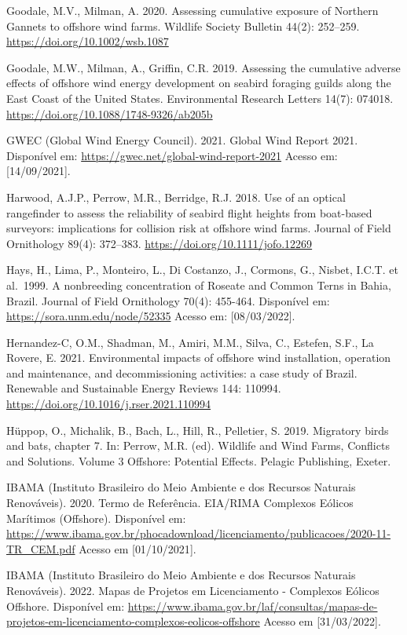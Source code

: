 \documentclass[
  oneside]{scrbook}
\begin{document}
Goodale, M.V., Milman, A. 2020. Assessing cumulative exposure of Northern Gannets to offshore wind farms. Wildlife Society Bulletin 44(2): 252--259. \url{https://doi.org/10.1002/wsb.1087}

Goodale, M.W., Milman, A., Griffin, C.R. 2019. Assessing the cumulative adverse effects of offshore wind energy development on seabird foraging guilds along the East Coast of the United States. Environmental Research Letters 14(7): 074018. \url{https://doi.org/10.1088/1748-9326/ab205b}

GWEC (Global Wind Energy Council). 2021. Global Wind Report 2021. Disponível em: \url{https://gwec.net/global-wind-report-2021} Acesso em: {[}14/09/2021{]}.

Harwood, A.J.P., Perrow, M.R., Berridge, R.J. 2018. Use of an optical rangefinder to assess the reliability of seabird flight heights from boat-based surveyors: implications for collision risk at offshore wind farms. Journal of Field Ornithology 89(4): 372--383. \url{https://doi.org/10.1111/jofo.12269}

Hays, H., Lima, P., Monteiro, L., Di Costanzo, J., Cormons, G., Nisbet, I.C.T. et al.~1999. A nonbreeding concentration of Roseate and Common Terns in Bahia, Brazil. Journal of Field Ornithology 70(4): 455-464. Disponível em: \url{https://sora.unm.edu/node/52335} Acesso em: {[}08/03/2022{]}.

Hernandez-C, O.M., Shadman, M., Amiri, M.M., Silva, C., Estefen, S.F., La Rovere, E. 2021. Environmental impacts of offshore wind installation, operation and maintenance, and decommissioning activities: a case study of Brazil. Renewable and Sustainable Energy Reviews 144: 110994. \url{https://doi.org/10.1016/j.rser.2021.110994}

Hüppop, O., Michalik, B., Bach, L., Hill, R., Pelletier, S. 2019. Migratory birds and bats, chapter 7. In: Perrow, M.R. (ed). Wildlife and Wind Farms, Conflicts and Solutions. Volume 3 Offshore: Potential Effects. Pelagic Publishing, Exeter.

IBAMA (Instituto Brasileiro do Meio Ambiente e dos Recursos Naturais Renováveis). 2020. Termo de Referência. EIA/RIMA Complexos Eólicos Marítimos (Offshore). Disponível em: \url{https://www.ibama.gov.br/phocadownload/licenciamento/publicacoes/2020-11-TR_CEM.pdf} Acesso em {[}01/10/2021{]}.

IBAMA (Instituto Brasileiro do Meio Ambiente e dos Recursos Naturais Renováveis). 2022. Mapas de Projetos em Licenciamento - Complexos Eólicos Offshore. Disponível em: \url{https://www.ibama.gov.br/laf/consultas/mapas-de-projetos-em-licenciamento-complexos-eolicos-offshore} Acesso em {[}31/03/2022{]}.
\end{document}
